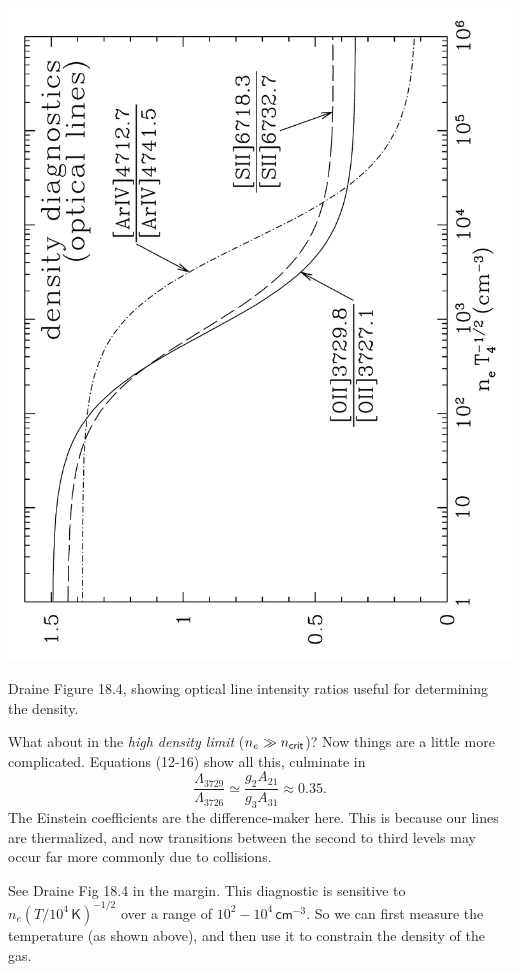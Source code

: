 \documentclass{tufte-handout}
\renewcommand{\rm}{\sf}
\renewcommand{\textrm}{\textsf}
\begin{document}
\begin{marginfigure}
\includegraphics[width=\columnwidth, angle=-90]{ism_figures/Draine-18_4}
\caption{Draine Figure 18.4, showing optical line intensity ratios useful for determining the density.}
\label{fig:determining density}
\end{marginfigure} 
What about in the \textit{high density limit} ($n_e \gg n_{\rm crit}$)? Now things are a little more complicated. Equations (12-16) show all this, culminate in 
\[\frac{\Lambda_{3729}}{\Lambda_{3726}} \simeq \frac{g_2 A_{21}}{g_3 A_{31}} \approx 0.35.\]
The Einstein coefficients are the difference-maker here. This is because our lines are thermalized, and now transitions between the second to third levels may occur far more commonly due to collisions.

See Draine Fig 18.4 in the margin. This diagnostic is sensitive to $n_e (T/10^4 \, \textrm{K})^{-1/2}$ over a range of $10^2 - 10^4\, \textrm{cm}^{-3}$. So we can first measure the temperature (as shown above), and then use it to constrain the density of the gas.
\end{document}
